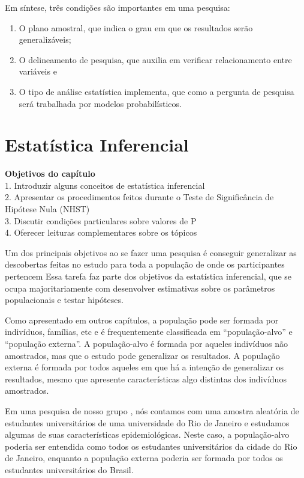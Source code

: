 \documentclass[
]{book}
\providecommand{\tightlist}{%
  \setlength{\itemsep}{0pt}\setlength{\parskip}{0pt}}
\begin{document}
Em síntese, três condições são importantes em uma pesquisa:

\begin{enumerate}
\def\labelenumi{(\arabic{enumi})}
\tightlist
\item
  O plano amostral, que indica o grau em que os resultados serão generalizáveis;
\item
  O delineamento de pesquisa, que auxilia em verificar relacionamento entre variáveis e\\
\item
  O tipo de análise estatística implementa, que como a pergunta de pesquisa será trabalhada por modelos probabilísticos.
\end{enumerate}

\hypertarget{estatuxedstica-inferencial}{%
\chapter{Estatística Inferencial}\label{estatuxedstica-inferencial}}

\begin{objectives}
\textbf{Objetivos do capítulo}\\
1. Introduzir alguns conceitos de estatística inferencial\\
2. Apresentar os procedimentos feitos durante o Teste de Significância
de Hipótese Nula (NHST)\\
3. Discutir condições particulares sobre valores de P\\
4. Oferecer leituras complementares sobre os tópicos
\end{objectives}

Um dos principais objetivos ao se fazer uma pesquisa é conseguir generalizar as descobertas feitas no estudo para toda a população de onde os participantes pertencem Essa tarefa faz parte dos objetivos da estatística inferencial, que se ocupa majoritariamente com desenvolver estimativas sobre os parâmetros populacionais e testar hipóteses.

Como apresentado em outros capítulos, a população pode ser formada por indivíduos, famílias, etc e é frequentemente classificada em ``população-alvo'' e ``população externa''. A população-alvo é formada por aqueles indivíduos não amostrados, mas que o estudo pode generalizar os resultados. A população externa é formada por todos aqueles em que há a intenção de generalizar os resultados, mesmo que apresente características algo distintas dos indivíduos amostrados.

Em uma pesquisa de nosso grupo \citep{AfonsoJunior2020}, nós contamos com uma amostra aleatória de estudantes universitários de uma universidade do Rio de Janeiro e estudamos algumas de suas características epidemiológicas. Neste caso, a população-alvo poderia ser entendida como todos os estudantes universitários da cidade do Rio de Janeiro, enquanto a população externa poderia ser formada por todos os estudantes universitários do Brasil.
\end{document}
